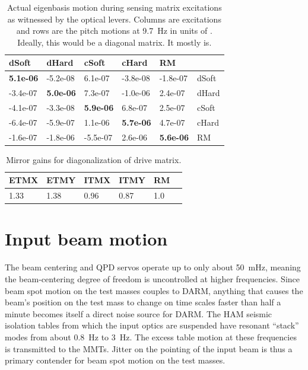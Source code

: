 \begin{table}
\centering
\caption{Actual eigenbasis motion during sensing matrix excitations as
  witnessed by the optical levers. Columns are excitations and rows are
  the pitch motions at 9.7~Hz in units of \microrad. Ideally, this
  would be a diagonal matrix. It mostly is.}
\begin{tabular}{l l l l l l}
\hline
dSoft & dHard  & cSoft & cHard & RM & \\
\hline
   \textbf{5.1e-06} & -5.2e-08  & 6.1e-07 & -3.8e-08 &  -1.8e-07 & dSoft\\
  -3.4e-07 &  \textbf{5.0e-06}  &  7.3e-07 & -1.0e-06 &  2.4e-07 & dHard\\
  -4.1e-07 & -3.3e-08 &  \textbf{5.9e-06} &  6.8e-07 &  2.5e-07 & cSoft\\
  -6.4e-07 & -5.9e-07 &  1.1e-06 &  \textbf{5.7e-06} &  4.7e-07 & cHard\\
  -1.6e-07 & -1.8e-06 & -5.5e-07 &   2.6e-06 &  \textbf{5.6e-06} & RM\\
\hline
\end{tabular}
\label{table:excitations_calibrated}
\end{table}



\begin{table}
\centering
\caption[Mirror gains for diagonalization of drive matrix]{Mirror
  gains for diagonalization of drive matrix.} 
\begin{tabular}{l l l l l l}
\hline
ETMX & ETMY & ITMX & ITMY & RM & \\
\hline
1.33 & 1.38 & 0.96 & 0.87 & 1.0 \\
\hline
\end{tabular}
\end{table}








\section{Input beam motion}
The beam centering and QPD servos operate up to only about 50~mHz,
meaning the beam-centering degree of freedom is uncontrolled at higher
frequencies. Since beam spot motion on the test masses couples to
DARM, anything that causes the beam's position on the test mass to
change on time scales faster than half a minute becomes itself a
direct noise source for DARM. The HAM seismic isolation tables from
which the input optics are suspended have resonant ``stack'' modes
from about 0.8~Hz to 3~Hz. The excess table motion at these
frequencies is transmitted to the MMTs. Jitter on the pointing of the
input beam is thus a primary contender for beam spot motion on the
test masses.


